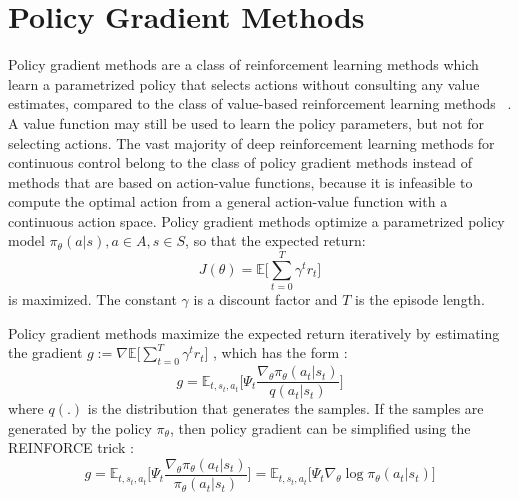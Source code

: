 \section{Policy Gradient Methods}
Policy gradient methods are a class of reinforcement learning methods which learn a parametrized policy that selects actions without consulting any value estimates, compared to the class of value-based reinforcement learning methods ~\cite{sutton1998reinforcement}. A value function may still be used to learn the policy parameters, but not for selecting actions. The vast majority of deep reinforcement learning methods for continuous control belong to the class of policy gradient methods instead of methods that are based on action-value functions, because it is infeasible to compute the optimal action from a general action-value function with a continuous action space.
Policy gradient methods optimize a parametrized policy model $\pi_\theta (a|s), a\in A, s\in S$, so that the expected return:
$$
    J(\theta) = \mathbb{E}\big[\sum_{t=0}^T\gamma^t r_t \big]
$$
is maximized. The constant $\gamma$ is a discount factor and $T$ is the episode length.

Policy gradient methods maximize the expected return iteratively by estimating the gradient $g := \nabla  \mathbb{E}\big[\sum_{t=0}^T\gamma^t r_t \big]$ , which has the form \cite{schulman2015high}:
\begin{equation} g = \mathbb{E}_{t,s_t,a_t} \big[
\Psi_t \frac{\nabla_\theta \pi_\theta(a_t|s_t) }{q(a_t|s_t)}
\big]
\label{pg_def}\end{equation}
where $q(.)$ is the distribution that generates the samples. If the samples are generated by the policy $\pi_\theta$, then policy gradient can be simplified using the REINFORCE trick \cite{williams1992simple}:
\begin{equation} g = \mathbb{E}_{t,s_t,a_t} \big[
\Psi_t \frac{\nabla_\theta \pi_\theta(a_t|s_t) }{\pi_\theta(a_t|s_t)}
\big]
=\mathbb{E}_{t,s_t,a_t} \big[
\Psi_t \nabla_\theta \log \pi_\theta(a_t|s_t) 
\big]
\label{pg_def_onpolicy}\end{equation}


